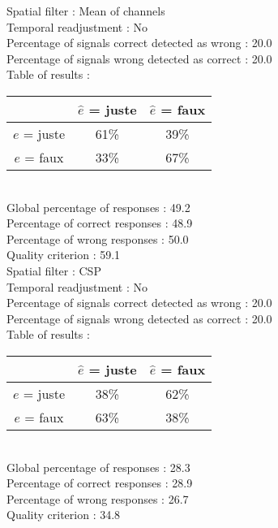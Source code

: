 Spatial filter : Mean of channels \\
Temporal readjustment : No \\
Percentage of signals correct detected as wrong :   20.0 \\
Percentage of signals wrong detected as correct :   20.0 \\
Table of results : \\
\begin{tabular}{|c|c|c|}
\hline				& $\hat{e}$ = juste & $\hat{e}$ = faux \\
\hline  $e$ = juste	&     61\%			&     39\%		\\
\hline  $e$ = faux	&     33\%			&     67\%		\\
\hline
\end{tabular}\\
Global percentage of responses :   49.2 \\
Percentage of correct responses :   48.9 \\
Percentage of wrong responses :   50.0 \\
Quality criterion :   59.1 \\

Spatial filter : CSP \\
Temporal readjustment : No \\
Percentage of signals correct detected as wrong :   20.0 \\
Percentage of signals wrong detected as correct :   20.0 \\
Table of results : \\
\begin{tabular}{|c|c|c|}
\hline				& $\hat{e}$ = juste & $\hat{e}$ = faux \\
\hline  $e$ = juste	&     38\%			&     62\%		\\
\hline  $e$ = faux	&     63\%			&     38\%		\\
\hline
\end{tabular}\\
Global percentage of responses :   28.3 \\
Percentage of correct responses :   28.9 \\
Percentage of wrong responses :   26.7 \\
Quality criterion :   34.8 \\

